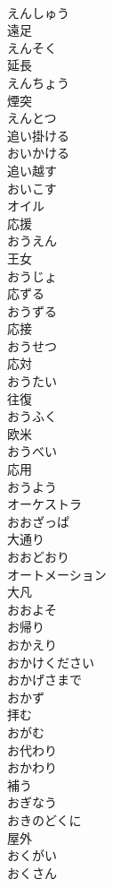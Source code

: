 \documentclass[8pt]{extreport}
\begin{document}
\begin{CJK}{UTF8}{min}
\\	えんしゅう	
\\	遠足 
\\	えんそく	
\\	延長 
\\	えんちょう	
\\	煙突 
\\	えんとつ	
\\	追い掛ける 
\\	おいかける	
\\	追い越す 
\\	おいこす	
\\	オイル	
\\	応援 
\\	おうえん	
\\	王女 
\\	おうじょ	
\\	応ずる 
\\	おうずる	
\\	応接 
\\	おうせつ	
\\	応対 
\\	おうたい	
\\	往復 
\\	おうふく	
\\	欧米 
\\	おうべい	
\\	応用 
\\	おうよう	
\\	オーケストラ	
\\	おおざっぱ	
\\	大通り 
\\	おおどおり	
\\	オートメーション	
\\	大凡 
\\	おおよそ	
\\	お帰り 
\\	おかえり	
\\	おかけください	
\\	おかげさまで	
\\	おかず	
\\	拝む 
\\	おがむ	
\\	お代わり 
\\	おかわり	
\\	補う 
\\	おぎなう	
\\	おきのどくに	
\\	屋外 
\\	おくがい	
\\	おくさん	

\end{CJK}
\end{document}
